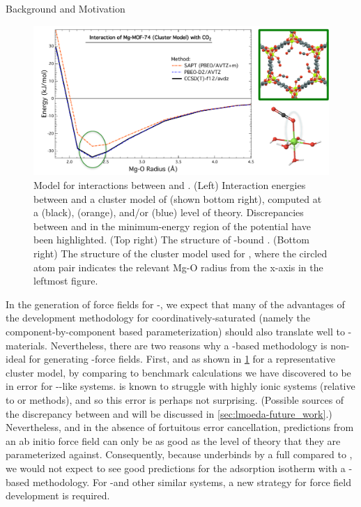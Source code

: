 \begin{section}{Background and Motivation}
    \begin{figure}
    \centering
    \includegraphics[width=1.0\textwidth]{lmoeda/sapt_breakdown.pdf}
    \caption[Model \pes for interactions between \co and \mgmof]
{
Model \pes for interactions between \co and \mgmof.  (Left) Interaction
energies between \co and a cluster model of \mgmof (shown bottom right),
computed at a \ccsdtf (black), \sapt (orange), and/or \pbeod (blue) level of
theory. Discrepancies
between \sapt and \ccsdtf in the minimum-energy region of the potential have
been highlighted. (Top right)
The structure of \co-bound \mgmof. (Bottom right) The structure of the cluster
model used for \mgmof, where the circled atom pair indicates the relevant Mg-O
radius from the x-axis in the leftmost figure.
            }
    \label{fig:lmoeda-sapt_breakdown}
    \end{figure}
%
%
In the generation of force fields for \cus-\mofs, we expect that many of the
advantages of the development methodology for coordinatively-saturated \mofs
(namely the component-by-component based
parameterization) should also translate
well to \cus-\mof materials. 
Nevertheless, there are two reasons why a \sapt-based methodology
is non-ideal for generating \cus-\mof force fields. First, and as shown in
\cref{fig:lmoeda-sapt_breakdown} for a representative \mgmof cluster model,
by comparing to benchmark \ccsdtf calculations we have discovered \sapt to be
in error for \cus-\mof-like systems.
\dftsapt is known to struggle with highly
ionic systems (relative to \ccsdt or \dft
methods),\cite{Lao2015a,Pastorczak2017} and so this error is perhaps not surprising.
(Possible sources of the discrepancy between \sapt and \ccsdtf will be
discussed in \cref{sec:lmoeda-future_work}.) Nevertheless, and in the absence of
fortuitous error cancellation,
predictions from an ab initio force field can only be
as good as the
level of theory that they are parameterized against. Consequently, because
\sapt underbinds \co 
by a full  compared to \ccsdtf, we would not expect to see
good predictions for the \co adsorption isotherm with a \sapt-based
methodology. For \cus-\mofs and other similar systems, a new strategy for force field development is required.


\end{section}
